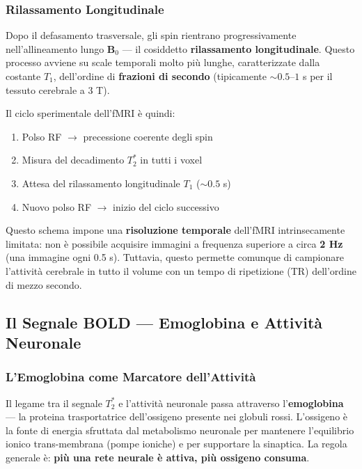 \subsubsection{Rilassamento Longitudinale}

Dopo il defasamento trasversale, gli spin rientrano progressivamente nell'allineamento lungo $\mathbf{B}_0$ — il cosiddetto \textbf{rilassamento longitudinale}. Questo processo avviene su scale temporali molto più lunghe, caratterizzate dalla costante \textbf{$T_1$}, dell'ordine di \textbf{frazioni di secondo} (tipicamente $\sim 0.5$--$1$ s per il tessuto cerebrale a 3 T).

Il ciclo sperimentale dell'fMRI è quindi:

\begin{enumerate}
    \item Polso RF $\rightarrow$ precessione coerente degli spin
    \item Misura del decadimento $T_2^*$ in tutti i voxel
    \item Attesa del rilassamento longitudinale $T_1$ ($\sim 0.5$ s)
    \item Nuovo polso RF $\rightarrow$ inizio del ciclo successivo
\end{enumerate}

Questo schema impone una \textbf{risoluzione temporale} dell'fMRI intrinsecamente limitata: non è possibile acquisire immagini a frequenza superiore a circa \textbf{2 Hz} (una immagine ogni 0.5 s). Tuttavia, questo permette comunque di campionare l'attività cerebrale in tutto il volume con un tempo di ripetizione (TR) dell'ordine di mezzo secondo.



\subsection{Il Segnale BOLD — Emoglobina e Attività Neuronale}

\subsubsection{L'Emoglobina come Marcatore dell'Attività}

Il legame tra il segnale $T_2^*$ e l'attività neuronale passa attraverso l'\textbf{emoglobina} — la proteina trasportatrice dell'ossigeno presente nei globuli rossi. L'ossigeno è la fonte di energia sfruttata dal metabolismo neuronale per mantenere l'equilibrio ionico trans-membrana (pompe ioniche) e per supportare la sinaptica. La regola generale è: \textbf{più una rete neurale è attiva, più ossigeno consuma}.

